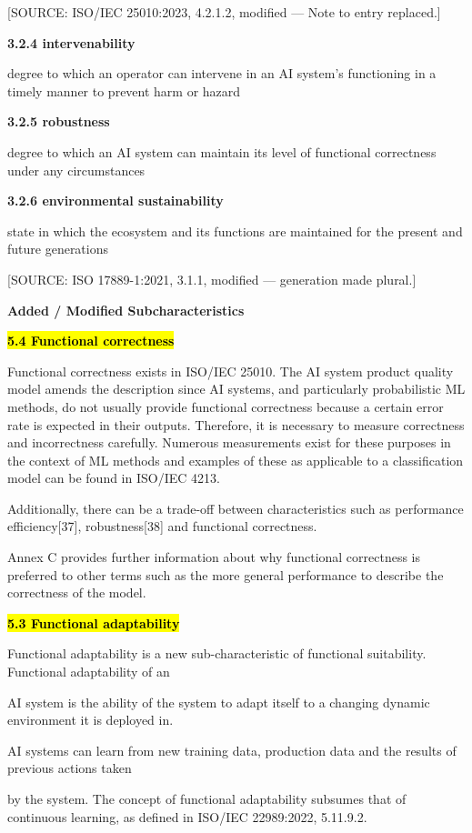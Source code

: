 \documentclass[
  letterpaper,
  DIV=11,
  numbers=noendperiod,
  oneside]{scrreprt}
\begin{document}
\begin{tcolorbox}
{[}SOURCE: ISO/IEC 25010:2023, 4.2.1.2, modified --- Note to entry
replaced.{]}

\textbf{3.2.4 intervenability}

degree to which an operator can intervene in an AI system's functioning
in a timely manner to prevent harm or hazard

\textbf{3.2.5 robustness}

degree to which an AI system can maintain its level of functional
correctness under any circumstances

\textbf{3.2.6 environmental sustainability}

state in which the ecosystem and its functions are maintained for the
present and future generations

{[}SOURCE: ISO 17889-1:2021, 3.1.1, modified --- generation made
plural.{]}

\textbf{Added / Modified Subcharacteristics}

\textbf{\hl{5.4 Functional correctness}}

Functional correctness exists in ISO/IEC 25010. The AI system product
quality model amends the description since AI systems, and particularly
probabilistic ML methods, do not usually provide functional correctness
because a certain error rate is expected in their outputs. Therefore, it
is necessary to measure correctness and incorrectness carefully.
Numerous measurements exist for these purposes in the context of ML
methods and examples of these as applicable to a classification model
can be found in ISO/IEC 4213.

Additionally, there can be a trade-off between characteristics such as
performance efficiency{[}37{]}, robustness{[}38{]} and functional
correctness.

Annex C provides further information about why functional correctness is
preferred to other terms such as the more general performance to
describe the correctness of the model.

\textbf{\hl{5.3 Functional adaptability}}

Functional adaptability is a new sub-characteristic of functional
suitability. Functional adaptability of an

AI system is the ability of the system to adapt itself to a changing
dynamic environment it is deployed in.

AI systems can learn from new training data, production data and the
results of previous actions taken

by the system. The concept of functional adaptability subsumes that of
continuous learning, as defined in ISO/IEC 22989:2022, 5.11.9.2.


\end{tcolorbox}
\end{document}
